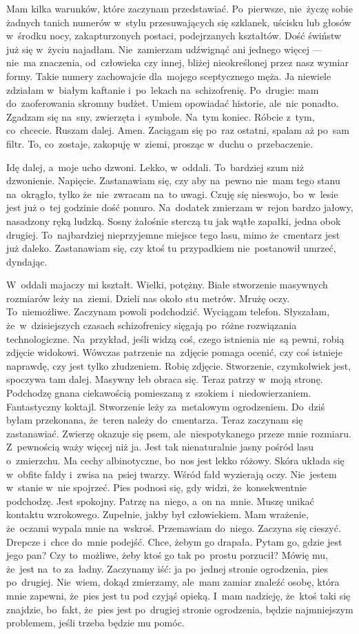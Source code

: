 \documentclass[9pt, a5paper]{memoir}
\begin{document}
Mam kilka warunków, które zaczynam przedstawiać. Po~pierwsze, nie~życzę sobie żadnych tanich numerów w~stylu przesuwających się szklanek, uścisku lub głosów w~środku nocy, zakapturzonych postaci, podejrzanych kształtów. Dość świństw już się w~życiu najadłam. Nie~zamierzam udźwignąć ani jednego więcej --- nie~ma znaczenia, od~człowieka czy innej, bliżej nieokreślonej przez nasz wymiar formy. Takie numery zachowajcie dla~mojego sceptycznego męża. Ja niewiele zdziałam w~białym kaftanie i~po~lekach na~schizofrenię.
Po~drugie: mam do~zaoferowania skromny budżet. Umiem opowiadać historie, ale~nic ponadto. Zgadzam się na~sny, zwierzęta i~symbole. Na~tym koniec. Róbcie z~tym, co~chcecie. Ruszam dalej. Amen. Zaciągam się po~raz ostatni, spalam aż po~sam filtr. To, co~zostaje, zakopuję w~ziemi, prosząc w~duchu o~przebaczenie.

Idę dalej, a~moje ucho dzwoni. Lekko, w~oddali. To~bardziej szum niż dzwonienie. Napięcie. Zastanawiam się, czy aby na~pewno nie~mam tego stanu na~okrągło, tylko że~nie~zwracam na~to uwagi. Czuję się nieswojo, bo~w~lesie jest już o~tej godzinie dość ponuro. Na~dodatek zmierzam w~rejon bardzo jałowy, nasadzony ręką ludzką. Sosny żałośnie sterczą tu jak wątłe zapałki, jedna obok drugiej. To~najbardziej nieprzyjemne miejsce tego lasu, mimo że~cmentarz jest już daleko. Zastanawiam się, czy ktoś tu przypadkiem nie~postanowił umrzeć, dyndając.

W~oddali majaczy mi kształt. Wielki, potężny. Białe stworzenie masywnych rozmiarów leży na~ziemi. Dzieli nas około stu metrów. Mrużę oczy. To~niemożliwe. Zaczynam powoli podchodzić. Wyciągam telefon.
Słyszałam, że~w~dzisiejszych czasach schizofrenicy sięgają po~różne rozwiązania technologiczne. Na~przykład, jeśli widzą coś, czego istnienia nie~są pewni, robią zdjęcie widokowi. Wówczas patrzenie na~zdjęcie pomaga ocenić, czy coś istnieje naprawdę, czy jest tylko złudzeniem.
Robię zdjęcie. Stworzenie, czymkolwiek jest, spoczywa tam dalej. Masywny łeb obraca się. Teraz patrzy w~moją stronę. Podchodzę gnana ciekawością pomieszaną z~szokiem i~niedowierzaniem. Fantastyczny koktajl.
Stworzenie leży za~metalowym ogrodzeniem. Do~dziś byłam przekonana, że~teren należy do~cmentarza. Teraz zaczynam się zastanawiać. Zwierzę okazuje się psem, ale~niespotykanego przeze mnie rozmiaru. Z~pewnością waży więcej niż ja. Jest tak nienaturalnie jasny pośród lasu o~zmierzchu. Ma cechy albinotyczne, bo~nos jest lekko różowy. Skóra układa się w~obfite fałdy i~zwisa na~psiej twarzy. Wśród fałd wyzierają oczy. Nie~jestem w~stanie w~nie spojrzeć. Pies podnosi się, gdy widzi, że~konsekwentnie podchodzę. Jest spokojny. Patrzę na~niego, a~on na~mnie. Muszę unikać kontaktu wzrokowego. Zupełnie, jakby był człowiekiem. Mam wrażenie, że~oczami wypala mnie na~wskroś.
Przemawiam do~niego. Zaczyna się cieszyć. Drepcze i~chce do~mnie podejść. Chce, żebym go drapała. Pytam go, gdzie jest jego pan? Czy to~możliwe, żeby ktoś go tak po~prostu porzucił? Mówię mu, że~jest na~to za~ładny. Zaczynamy iść: ja po~jednej stronie ogrodzenia, pies po~drugiej. Nie~wiem, dokąd zmierzamy, ale~mam zamiar znaleźć osobę, która mnie zapewni, że~pies jest tu pod czyjąś opieką. I~mam nadzieję, że~ktoś taki się znajdzie, bo~fakt, że~pies jest po~drugiej stronie ogrodzenia, będzie najmniejszym problemem, jeśli trzeba będzie mu pomóc.
\end{document}
